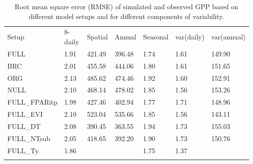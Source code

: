 \documentclass[gmd, manuscript]{copernicus}
\begin{document}
\begin{table}[t]
\caption{Root mean square error (RMSE) of simulated and observed GPP based on different model setups and for different components of variability.} 
\begin{tabular}{lllllll}
  \tophline
  Setup & 8-daily & Spatial & Annual & Seasonal & var(daily) & var(annual) \\ 
  \middlehline
  FULL & 1.91 & 421.49 & 396.48 & 1.74 & 1.61 & 149.90 \\ 
  BRC & 2.01 & 455.58 & 444.06 & 1.80 & 1.61 & 151.65 \\ 
  ORG & 2.13 & 485.62 & 474.46 & 1.92 & 1.60 & 152.91 \\ 
  NULL & 2.10 & 468.14 & 478.02 & 1.85 & 1.56 & 153.26 \\ 
  \middlehline
  FULL\_FPARitp & 1.98 & 427.46 & 402.94 & 1.77 & 1.71 & 148.96 \\ 
  FULL\_EVI & 2.10 & 523.04 & 535.66 & 1.85 & 1.56 & 143.11 \\ 
  \middlehline
  FULL\_DT & 2.08 & 390.45 & 363.55 & 1.94 & 1.73 & 155.03 \\ 
  FULL\_NTsub & 2.05 & 418.65 & 392.20 & 1.90 & 1.73 & 150.76 \\ 
  FULL\_Ty & 1.86 &  &  & 1.75 & 1.37 & \\ 
  \bottomhline
  \end{tabular}
\label{tab:rmse}
\end{table}
\end{document}
